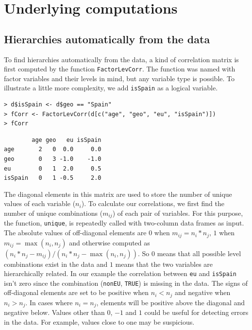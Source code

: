 \hypertarget{underlying-computations}{%
\section{Underlying computations}\label{underlying-computations}}

\hypertarget{hierarchies-automatically-from-the-data}{%
\subsection{Hierarchies automatically from the data}\label{hierarchies-automatically-from-the-data}}

To find hierarchies automatically from the data, a kind of correlation matrix is first computed by the function \texttt{FactorLevCorr}.
The function was named with factor variables and their levels in mind, but any variable type is possible.
To illustrate a little more complexity, we add \texttt{isSpain} as a logical variable.

\begin{verbatim}
> d$isSpain <- d$geo == "Spain"
> fCorr <- FactorLevCorr(d[c("age", "geo", "eu", "isSpain")])
> fCorr
\end{verbatim}

\begin{verbatim}
        age geo   eu isSpain
age       2   0  0.0     0.0
geo       0   3 -1.0    -1.0
eu        0   1  2.0     0.5
isSpain   0   1 -0.5     2.0
\end{verbatim}

The diagonal elements in this matrix are used to store the number of unique values of each variable (\(n_i\)).
To calculate our correlations, we first find the number of unique combinations (\(m_{ij}\)) of each pair of variables.
For this purpose, the function, \texttt{unique}, is repeatedly called with two-column data frames as input.
The absolute values of off-diagonal elements are
\(0\) when \(m_{ij} = n_i*n_j\),
\(1\) when \(m_{ij} = \max(n_i, n_j)\) and otherwise computed as
\((n_i*n_j-m_{ij})/(n_i*n_j-\max(n_i, n_j))\).
So \(0\) means that all possible level combinations exist in the data and \(1\) means that the two variables are hierarchically related. In our example the correlation between \texttt{eu} and \texttt{isSpain} isn't zero since the combination (\texttt{nonEU}, \texttt{TRUE}) is missing in the data.
The signs of off-diagonal elements are set to be positive when \(n_i<n_j\) and negative when \(n_i>n_j\).
In cases where \(n_i=n_j\), elements will be positive above the diagonal and negative below.
Values other than \(0\), \(-1\) and \(1\) could be useful for detecting errors in the data. For example, values close to one may be suspicious.


